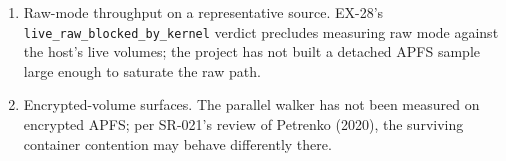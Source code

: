 \begin{enumerate}
  \item Raw-mode throughput on a representative source. EX-28's
    \texttt{live\_raw\_blocked\_by\_kernel} verdict precludes
    measuring raw mode against the host's live volumes; the
    project has not built a detached APFS sample large enough to
    saturate the raw path.
  \item Encrypted-volume surfaces. The parallel walker has not
    been measured on encrypted APFS; per SR-021's review of
    Petrenko (2020), the surviving container contention may
    behave differently there.
\end{enumerate}
